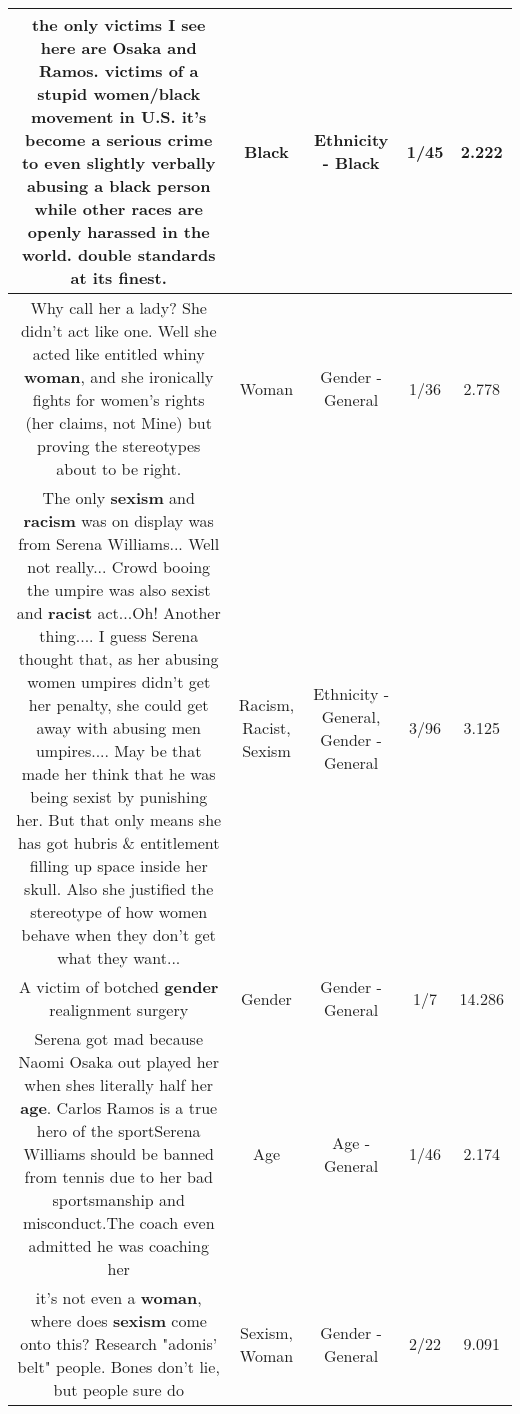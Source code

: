 \documentclass[11pt]{article}
\newlength\mylength
\begin{document}
\begin{center}
\begin{longtable}{|C{.65\mylength}|C{.30\mylength}|C{.12\mylength}|C{.12\mylength}|C{.12\mylength}|}
  \small the only victims I see here are Osaka and Ramos. victims of a stupid women/\textbf{black} movement in U.S. it's become a serious crime to even slightly verbally abusing a \textbf{black} person while other races are openly harassed in the world. double standards at its finest.\normalsize   & Black & Ethnicity - Black & 1/45 & 2.222 \\  \hline
  \small Why call her a lady? She didn't act like one. Well she acted like entitled whiny \textbf{woman}, and she ironically fights for women's rights (her claims, not Mine) but proving the stereotypes about to be right.\normalsize   & Woman & Gender - General & 1/36 & 2.778 \\  \hline
  \small The only \textbf{sexism} and \textbf{racism} was on display was from Serena Williams... Well not really... Crowd booing the umpire was also sexist and \textbf{racist} act...Oh! Another thing.... I guess Serena thought that, as her abusing women umpires didn't get her penalty, she could get away with abusing men umpires.... May be that made her think that he was being sexist by punishing her. But that only means she has got hubris \& entitlement filling up space inside her skull. Also she justified the stereotype of how women behave when they don't get what they want...\normalsize   & Racism, Racist, Sexism & Ethnicity - General, Gender - General & 3/96 & 3.125 \\  \hline
  \small A victim of botched \textbf{gender} realignment surgery\normalsize   & Gender & Gender - General & 1/7 & 14.286 \\  \hline
  \small Serena got mad because Naomi Osaka out played her when shes literally half her \textbf{age}.  Carlos Ramos is a true hero of the sportSerena Williams should be banned from tennis due to her bad sportsmanship and misconduct.The coach even admitted he was coaching her\normalsize   & Age & Age - General & 1/46 & 2.174 \\  \hline
  \small it's not even a \textbf{woman}, where does \textbf{sexism} come onto this? Research "adonis' belt" people. Bones don't lie, but people sure do\normalsize   & Sexism, Woman & Gender - General & 2/22 & 9.091 \\  \hline

\end{longtable}
\end{center}
\end{document}
